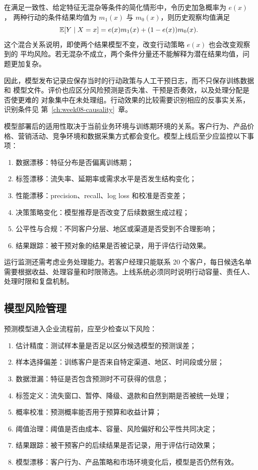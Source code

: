 在满足一致性、给定特征无混杂等条件的简化情形中，令历史加急概率为 \(e(x)\)，
两种行动的条件结果均值为 \(m_1(x)\) 与 \(m_0(x)\)，则历史观察均值满足
\[
\mathbb E[Y\mid X=x]=e(x)m_1(x)+(1-e(x))m_0(x).
\]
这个混合关系说明，即使两个结果模型不变，改变行动策略 \(e(x)\) 也会改变观察到的
平均风险。若无混杂不成立，两个条件分量还不能解释为潜在结果均值，问题更加复杂。

因此，模型发布记录应保存当时的行动政策与人工干预日志，而不只保存训练数据和
模型文件。评价也应区分风险预测是否失准、干预是否奏效，以及处理分配是否使更难的
对象集中在未处理组。行动效果的比较需要识别相应的反事实关系，识别条件见
第~\ref{ch:week08-causality}~章。

模型部署后的适用性取决于当前业务环境与训练期环境的关系。客户行为、产品价格、营销活动、竞争环境和数据采集方式都会变化。模型上线后至少应监控以下事项：
\begin{enumerate}
  \item 数据漂移：特征分布是否偏离训练期；
  \item 标签漂移：流失率、延期率或需求水平是否发生结构变化；
  \item 性能漂移：precision、recall、log loss 和校准是否变差；
  \item 决策策略变化：模型推荐是否改变了后续数据生成过程；
  \item 公平性与合规：不同客户分层、地区或渠道是否受到不合理影响；
  \item 结果跟踪：被干预对象的结果是否被记录，用于评估行动效果。
\end{enumerate}

运行监测还需考虑业务处理能力。若客户经理只能联系 20 个客户，每日候选名单需要根据收益、处理容量和时限筛选。上线系统必须同时说明行动容量、责任人、处理时限和复盘机制。

\subsection{模型风险管理}

预测模型进入企业流程前，应至少检查以下风险：
\begin{enumerate}
  \item 估计精度：测试样本量是否足以区分候选模型的预测误差；
  \item 样本选择偏差：训练客户是否来自特定渠道、地区、时间段或分层；
  \item 数据泄漏：特征是否包含预测时不可获得的信息；
  \item 标签定义：流失窗口、暂停、降级、退款和自然到期是否被统一处理；
  \item 概率校准：预测概率能否用于预算和收益计算；
  \item 阈值治理：阈值是否由成本、容量、风险偏好和公平性共同决定；
  \item 结果跟踪：被干预客户的后续结果是否记录，用于评估行动效果；
  \item 模型漂移：客户行为、产品策略和市场环境变化后，模型是否仍然有效。
\end{enumerate}

